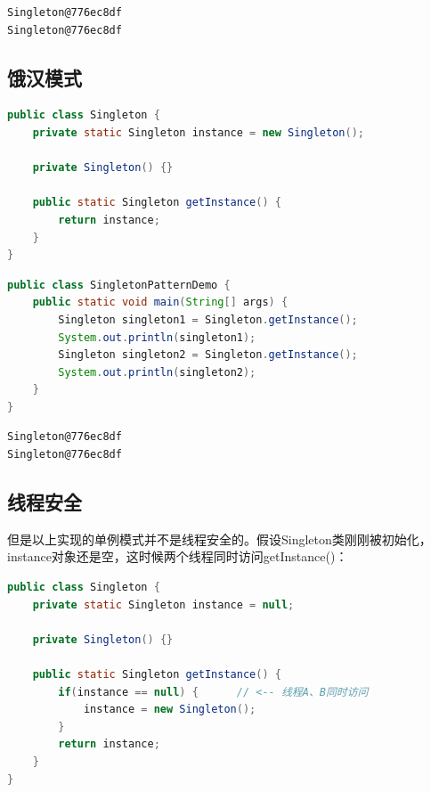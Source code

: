 \begin{tcolorbox}
    \begin{verbatim}
Singleton@776ec8df
Singleton@776ec8df
\end{verbatim}
\end{tcolorbox}

\vspace{0.5cm}

\subsection{饿汉模式}

\begin{lstlisting}[language=Java, title=Singleton.java]
public class Singleton {
    private static Singleton instance = new Singleton();

    private Singleton() {}

    public static Singleton getInstance() {
        return instance;
    }
}
\end{lstlisting}

\begin{lstlisting}[language=Java, title=SingletonPatternDemo.java]
public class SingletonPatternDemo {
    public static void main(String[] args) {
        Singleton singleton1 = Singleton.getInstance();
        System.out.println(singleton1);
        Singleton singleton2 = Singleton.getInstance();
        System.out.println(singleton2);
    }
}
\end{lstlisting}

\begin{tcolorbox}
    \begin{verbatim}
Singleton@776ec8df
Singleton@776ec8df
\end{verbatim}
\end{tcolorbox}

\vspace{0.5cm}

\subsection{线程安全}

但是以上实现的单例模式并不是线程安全的。假设Singleton类刚刚被初始化，instance对象还是空，这时候两个线程同时访问getInstance()：

\vspace{-0.5cm}

\begin{lstlisting}[language=Java]
public class Singleton {
    private static Singleton instance = null;

    private Singleton() {}

    public static Singleton getInstance() {
        if(instance == null) {      // <-- 线程A、B同时访问
            instance = new Singleton();
        }
        return instance;
    }
}
\end{lstlisting}

